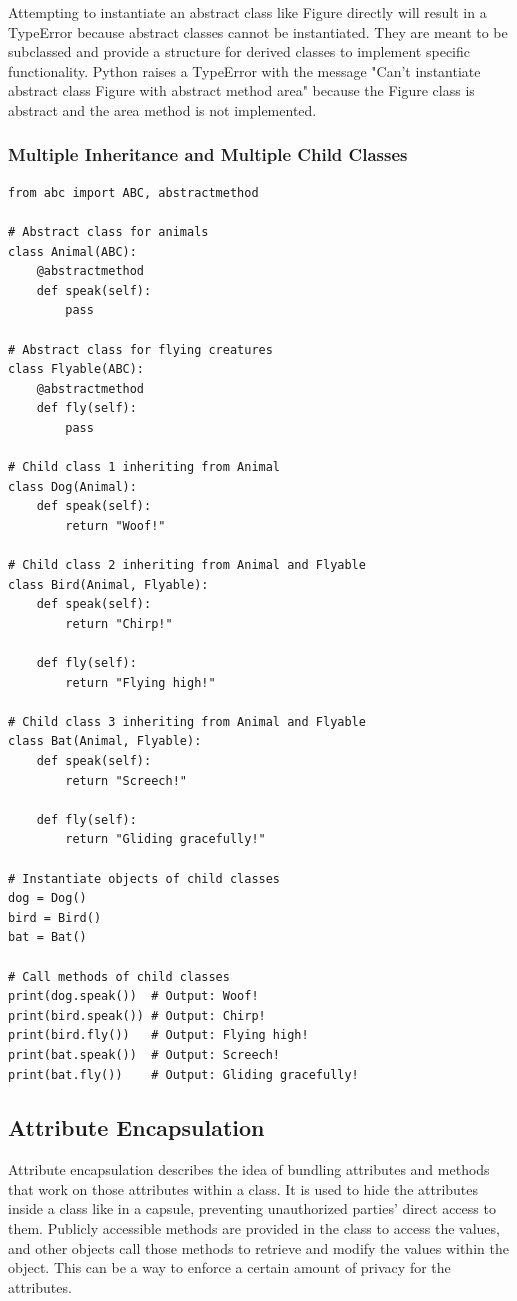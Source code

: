 Attempting to instantiate an abstract class like Figure directly will result in a TypeError because abstract classes cannot be instantiated. They are meant to be subclassed and provide a structure for derived classes to implement specific functionality. Python raises a TypeError with the message "Can't instantiate abstract class Figure with abstract method area" because the Figure class is abstract and the area method is not implemented.

\subsubsection{Multiple Inheritance and Multiple Child Classes}

\begin{codebox}
\begin{verbatim}
from abc import ABC, abstractmethod

# Abstract class for animals
class Animal(ABC):
    @abstractmethod
    def speak(self):
        pass

# Abstract class for flying creatures
class Flyable(ABC):
    @abstractmethod
    def fly(self):
        pass

# Child class 1 inheriting from Animal
class Dog(Animal):
    def speak(self):
        return "Woof!"

# Child class 2 inheriting from Animal and Flyable
class Bird(Animal, Flyable):
    def speak(self):
        return "Chirp!"

    def fly(self):
        return "Flying high!"

# Child class 3 inheriting from Animal and Flyable
class Bat(Animal, Flyable):
    def speak(self):
        return "Screech!"

    def fly(self):
        return "Gliding gracefully!"

# Instantiate objects of child classes
dog = Dog()
bird = Bird()
bat = Bat()

# Call methods of child classes
print(dog.speak())  # Output: Woof!
print(bird.speak()) # Output: Chirp!
print(bird.fly())   # Output: Flying high!
print(bat.speak())  # Output: Screech!
print(bat.fly())    # Output: Gliding gracefully!
\end{verbatim}
\end{codebox}


\newpage
\subsection{Attribute Encapsulation}
Attribute encapsulation describes the idea of bundling attributes and methods that work on those attributes within a class. It is used to hide the attributes inside a class like in a capsule, preventing unauthorized parties' direct access to them. Publicly accessible methods are provided in the class to access the values, and other objects call those methods to retrieve and modify the values within the object. This can be a way to enforce a certain amount of privacy for the attributes.\\

